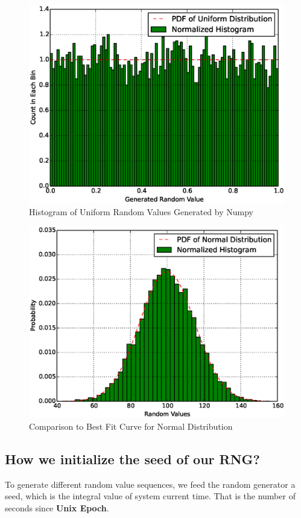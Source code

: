 \documentclass[12pt]{article}  %
\theoremstyle{definition}
\theoremstyle{remark}
\begin{document}
\begin{figure}
\centering
        \includegraphics[scale=0.6]{rg_histogram.eps}
        \caption{Histogram of Uniform Random Values Generated by Numpy}
        \label{fig:uniform}
\end{figure}
\begin{figure}
        \centering
        \includegraphics[scale=0.6]{rg_fitness.eps}
        \caption{Comparison to Best Fit Curve for Normal Distribution}
        \label{fig:normal}
\end{figure}

\subsection{How we initialize the seed of our RNG?}
To generate different random value sequences, we feed the random generator a seed, which is the integral value of system current time.
That is the number of seconds since \textbf{Unix Epoch}.
\end{document}
